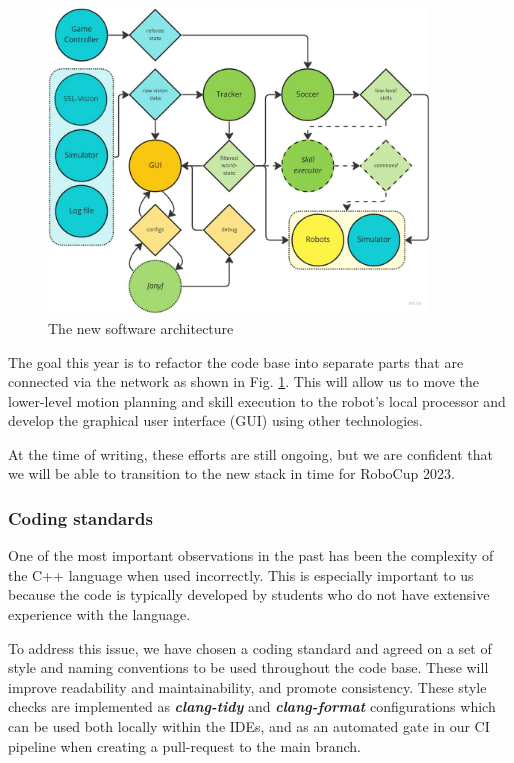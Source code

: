\documentclass[runningheads]{llncs}
\begin{document}
\begin{figure}
	\centering
	\includegraphics[width=0.9\textwidth]{images/software-architecture.jpg}
	\caption{The new software architecture}
	\label{fig:software-architecture}
\end{figure}

The goal this year is to refactor the code base into separate parts that are connected via the network as shown in Fig. \ref{fig:software-architecture}. This will allow us to move the lower-level motion planning and skill execution to the robot's local processor and develop the graphical user interface (GUI) using other technologies.

At the time of writing, these efforts are still ongoing, but we are confident that we will be able to transition to the new stack in time for RoboCup 2023.

\subsubsection{Coding standards}
One of the most important observations in the past has been the complexity of the C++ language when used incorrectly. This is especially important to us because the code is typically developed by students who do not have extensive experience with the language.

To address this issue, we have chosen a coding standard \cite{ref_cppbestpractices} and agreed on a set of style and naming conventions to be used throughout the code base. These will improve readability and maintainability, and promote consistency. These style checks are implemented as \textbf{\textit{clang-tidy}} and \textbf{\textit{clang-format}} configurations which can be used both locally within the IDEs, and as an automated gate in our CI pipeline when creating a pull-request to the main branch.
\end{document}
